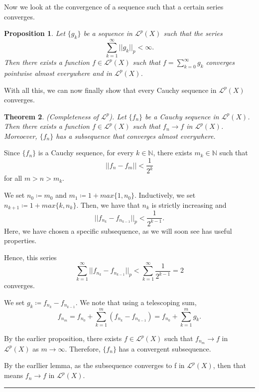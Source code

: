 \documentclass[twoside]{article}
\newcounter{lecnum}
\newtheorem{theorem}{Theorem}[lecnum]
\newtheorem{proposition}[theorem]{Proposition}
\newenvironment{proof}{{\bf Proof:}}{\hfill\rule{2mm}{2mm}}
\begin{document}
Now we look at the convergence of a sequence such that a certain series converges.

\begin{proposition}Let $\{g_k\}$ be a sequence in $\mathcal{L}^p(X)$ such that the series
$$
\sum_{k=1}^{\infty}||g_k||_p < \infty.
$$
Then there exists a function $f \in \mathcal{L}^p(X)$ such that $f = \sum_{k=0}^{\infty}g_k$ converges pointwise almost everywhere and in $\mathcal{L}^p(X)$.
\end{proposition}


With all this, we can now finally show that every Cauchy sequence in $\mathcal{L}^p(X)$ converges.

\begin{theorem}(Completeness of $\mathcal{L}^p$). Let $\{f_n\}$ be a Cauchy sequence in $\mathcal{L}^p(X)$. Then there exists a function $f \in \mathcal{L}^p(X)$ such that $f_n \rightarrow f$ in $\mathcal{L}^p(X)$. Moreoever, $\{f_n\}$ has a subsequence that converges almost everywhere.
\end{theorem}

\begin{proof} Since $\{f_n\}$ is a Cauchy sequence, for every $k \in \mathbb{N}$, there exists $m_k \in \mathbb{N}$ such that
$$
||f_n - f_m|| < \frac{1}{2^k}
$$
for all $m > n > m_k$. 

We set $n_0 \coloneqq m_0$ and $m_1 \coloneqq 1 + max\{1,n_0\}$. Inductively, we set $n_{k+1} \coloneqq 1 + max\{k,n_k\}$. Then, we have that $n_k$ is strictly increasing and
$$
||f_{n_k} - f_{n_{k-1}}||_p < \frac{1}{2^{k-1}} .
$$
Here, we have chosen a specific subsequence, as we will soon see has useful properties.

Hence, this series 
$$
\sum_{k=1}^{\infty}||f_{n_k} - f_{n_{k-1}}||_p < \sum_{k=1}^{\infty}\frac{1}{2^{k-1}} = 2
$$
converges.

We set $g_k \coloneqq f_{n_k} - f_{n_{k-1}}$. We note that using a telescoping sum, 
$$
f_{n_m} = f_{n_0} + \sum_{k=1}^m(f_{n_k} - f_{n_{k-1}}) = f_{n_0} + \sum_{k=1}^mg_k.
$$

By the earlier proposition, there exists $f \in \mathcal{L}^p(X)$ such that $f_{n_m} \rightarrow f$ in $\mathcal{L}^p(X)$ as $m \rightarrow \infty$. Therefore, $\{f_n\}$ has a convergent subsequence. 

By the earllier lemma, as the subsequence converges to f in $\mathcal{L}^p(X)$, then that means $f_n \rightarrow f$ in $\mathcal{L}^p(X)$.
\end{proof}
\end{document}
